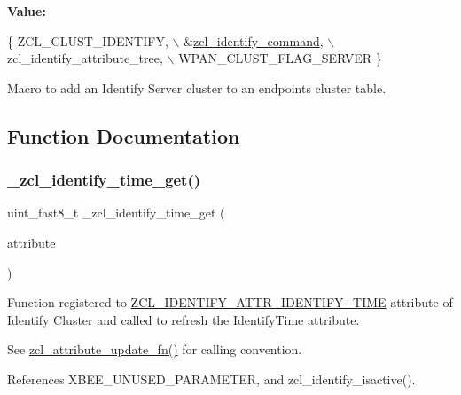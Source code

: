 {\bfseries Value\+:}
\begin{DoxyCode}
\{ ZCL\_CLUST\_IDENTIFY,                  \(\backslash\)
      &\hyperlink{group__zcl__identify_ga94a1fe7c8892b55e0ffd3e2795139b1d}{zcl\_identify\_command},               \(\backslash\)
      zcl\_identify\_attribute\_tree,        \(\backslash\)
      WPAN\_CLUST\_FLAG\_SERVER \}
\end{DoxyCode}


Macro to add an Identify Server cluster to an endpoint\textquotesingle{}s cluster table. 



\subsection{Function Documentation}
\mbox{\label{group__zcl__identify_ga7cde47425d0a779f5aff87985ea01951}} 
\subsubsection{\texorpdfstring{\+\_\+zcl\+\_\+identify\+\_\+time\+\_\+get()}{\_zcl\_identify\_time\_get()}}
{\footnotesize\ttfamily uint\+\_\+fast8\+\_\+t \+\_\+zcl\+\_\+identify\+\_\+time\+\_\+get (\begin{DoxyParamCaption}\item[{const \hyperlink{structzcl__attribute__full__t}{zcl\+\_\+attribute\+\_\+full\+\_\+t} \hyperlink{group__hal_gaef060b3456fdcc093a7210a762d5f2ed}{F\+AR} $\ast$}]{attribute }\end{DoxyParamCaption})}



Function registered to \hyperlink{group__zcl__identify_ga7df877a02f273adc190aa24ad0aff4c9}{Z\+C\+L\+\_\+\+I\+D\+E\+N\+T\+I\+F\+Y\+\_\+\+A\+T\+T\+R\+\_\+\+I\+D\+E\+N\+T\+I\+F\+Y\+\_\+\+T\+I\+ME} attribute of Identify Cluster and called to refresh the Identify\+Time attribute. 

See \hyperlink{group__zcl_gace94cfc3f22379fa08a5b8de8c6977f6}{zcl\+\_\+attribute\+\_\+update\+\_\+fn()} for calling convention. 

References X\+B\+E\+E\+\_\+\+U\+N\+U\+S\+E\+D\+\_\+\+P\+A\+R\+A\+M\+E\+T\+ER, and zcl\+\_\+identify\+\_\+isactive().

